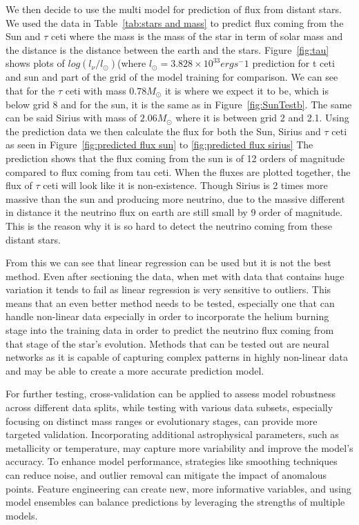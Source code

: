 We then decide to use the multi model for prediction of flux from distant stars. We used the data in Table~\ref{tab:stars and mass} to predict flux coming from the Sun and $\tau$ ceti where the mass is the mass of the star in term of solar mass and the distance is the distance between the earth and the stars. Figure~\ref{fig:tau} shows plots of $log(l_\nu/l_\odot)$(where $l_\odot=3.828\times 10^33ergs^-1$ prediction for t ceti and sun and part of the grid of the model training for comparison. We can see that for the $\tau$ ceti with mass $0.78M_\odot$ it is where we expect it to be, which is below grid 8 and for the sun, it is the same as in Figure~\ref{fig:SunTestb}. The same can be said Sirius with mass of $2.06M_\odot$ where it is between grid 2 and 2.1. Using the prediction data we then calculate the flux for both the Sun, Sirius and $\tau$ ceti as seen in Figure~\ref{fig:predicted flux sun} to \ref{fig:predicted flux sirius} The prediction shows that the flux coming from the sun is of 12 orders of magnitude compared to flux coming from tau ceti. When the fluxes are plotted together, the flux of $\tau$ ceti will look like it is non-existence. Though Sirius is 2 times more massive than the sun and producing more neutrino, due to the massive different in distance it the neutrino flux on earth are still small by 9 order of magnitude. This is the reason why it is so hard to detect the neutrino coming from these distant stars. 

From this we can see that linear regression can be used but it is not the best method. Even after sectioning the data, when met with data that contains huge variation it tends to fail as linear regression is very sensitive to outliers. This means that an even better method needs to be tested, especially one that can handle non-linear data especially in order to incorporate the helium burning stage into the training data in order to predict the neutrino flux coming from that stage of the star's evolution. Methods that can be tested out are neural networks as it is capable of capturing complex patterns in highly non-linear data and may be able to create a more accurate prediction model.

For further testing, cross-validation can be applied to assess model robustness across different data splits, while testing with various data subsets, especially focusing on distinct mass ranges or evolutionary stages, can provide more targeted validation. Incorporating additional astrophysical parameters, such as metallicity or temperature, may capture more variability and improve the model's accuracy. To enhance model performance, strategies like smoothing techniques can reduce noise, and outlier removal can mitigate the impact of anomalous points. Feature engineering can create new, more informative variables, and using model ensembles can balance predictions by leveraging the strengths of multiple models.
